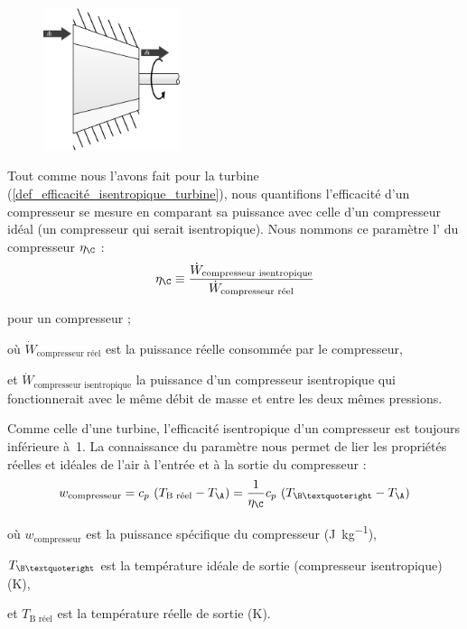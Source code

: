 		\begin{figure}
			\begin{center}
				\includegraphics[width=4cm]{images/symbole_compresseur.png}
			\end{center}
			\label{fig_schéma_compresseur2}
		\end{figure}

		Tout comme nous l’avons fait pour la turbine (\ref{def_efficacité_isentropique_turbine}), nous quantifions l’efficacité d’un compresseur se mesure en comparant sa puissance avec celle d’un compresseur idéal (un compresseur qui serait isentropique). Nous nommons ce paramètre l’ du compresseur $\eta_\C$ :
		\begin{equation}
			\eta_\C \equiv  \frac{\dot W_\text{compresseur isentropique}}{\dot W_\text{compresseur réel}}
			\label{def_efficacité_isentropique_compresseur}
		\end{equation}
		\begin{equationterms}
			\item pour un compresseur ;
			\item où \tab $\dot W_\text{compresseur réel}$ \tab\tab\tab est la puissance réelle consommée par le compresseur,
			\item et \tab $\dot W_\text{compresseur isentropique}$ \tab la puissance d’un compresseur isentropique qui fonctionnerait avec le même débit de masse et entre les deux mêmes pressions.
		\end{equationterms}

		Comme celle d’une turbine, l’efficacité isentropique d’un compresseur est toujours inférieure à~1. La connaissance du paramètre nous permet de lier les propriétés réelles et idéales de l’air à l’entrée et à la sortie du compresseur :
		\begin{equation}
			w_\text{compresseur} = c_p \ (T_\text{B réel} - T_\A) = \frac{1}{\eta_\C} c_p \ (T_{\B’} - T_\A)
			\label{eq_puissance_compresseur}
		\end{equation}
		\begin{equationterms}
			\item où \tab $w_\text{compresseur}$ 	\tab est la puissance spécifique du compresseur (\si{\joule\per\kilogram}),
			\item 	\tab $T_{\B’}$ 					\tab\tab\tab est la température idéale de sortie (compresseur isentropique) (\si{\kelvin}),
			\item et \tab $T_\text{B réel}$ 			\tab est la température réelle de sortie (\si{\kelvin}).
		\end{equationterms}

